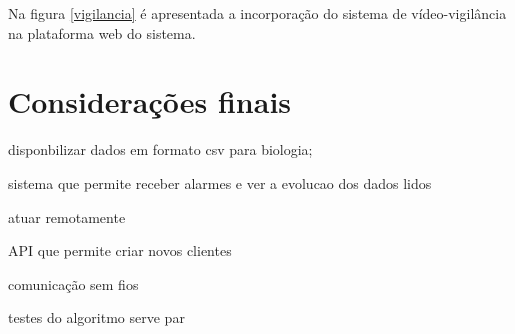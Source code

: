 Na figura \ref{vigilancia} é apresentada a incorporação do sistema de vídeo-vigilância na plataforma web do sistema. 

\section{Considerações finais}



disponbilizar dados em formato csv para biologia; 

sistema que permite receber alarmes e ver a evolucao dos dados lidos 

atuar remotamente 

API que permite criar novos clientes 

comunicação sem fios 


testes do algoritmo serve par
